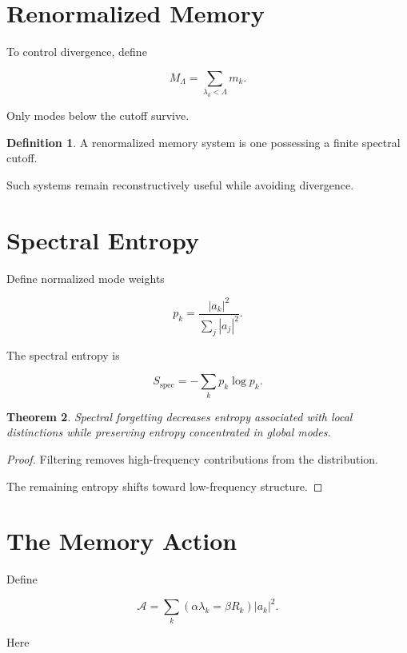 \documentclass[12pt,oneside]{book}
\theoremstyle{plain} \newtheorem{theorem}{Theorem}[chapter] \newtheorem{lemma}[theorem]{Lemma} \newtheorem{proposition}[theorem]{Proposition} \newtheorem{corollary}[theorem]{Corollary}
\theoremstyle{definition} \newtheorem{definition}[theorem]{Definition} \newtheorem{axiom}[theorem]{Axiom} \newtheorem{construction}[theorem]{Construction}
\theoremstyle{remark} \newtheorem{remark}[theorem]{Remark} \newtheorem{example}[theorem]{Example}
\begin{document}
\section{Renormalized Memory}

To control divergence, define

\[
M_\Lambda
=
\sum_{\lambda_k<\Lambda}
m_k.
\]

Only modes below the cutoff survive.

\begin{definition}

A renormalized memory system is one possessing a finite spectral cutoff.

\end{definition}

Such systems remain reconstructively useful while avoiding divergence.

\section{Spectral Entropy}

Define normalized mode weights

\[
p_k
=
\frac{|a_k|^2}
{\sum_j |a_j|^2}.
\]

The spectral entropy is

\[
S_{\mathrm{spec}}
=
-\sum_k
p_k
\log p_k.
\]

\begin{theorem}

Spectral forgetting decreases entropy associated with local distinctions while preserving entropy concentrated in global modes.

\end{theorem}

\begin{proof}

Filtering removes high-frequency contributions from the distribution.

The remaining entropy shifts toward low-frequency structure.

\end{proof}

\section{The Memory Action}

Define

\[
\mathcal A
=
\sum_k
\left(
\alpha \lambda_k
=
\beta R_k
\right)
|a_k|^2.
\]

Here
\end{document}
